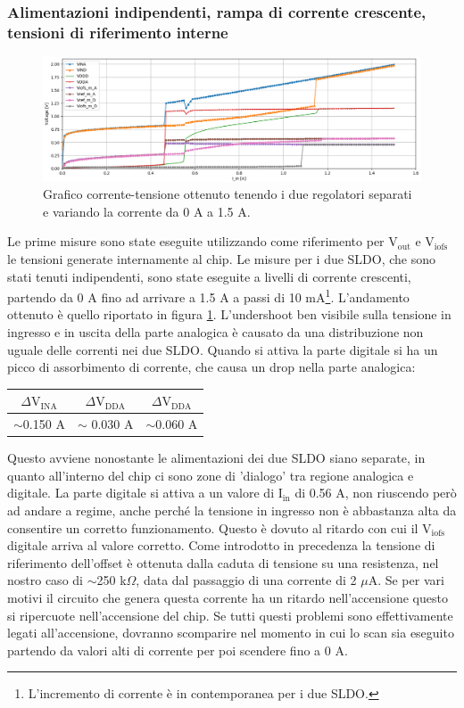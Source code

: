 \subsubsection{Alimentazioni indipendenti, rampa di corrente crescente, tensioni di riferimento interne}
\begin{figure}
\centering
\includegraphics[width=\textwidth]{Immagini/IUI2}
\caption{Grafico corrente-tensione ottenuto tenendo i due regolatori separati e variando la corrente da 0 A a 1.5 A.}
\label{IUI}
\end{figure}
Le prime misure sono state eseguite utilizzando come riferimento per $\mathrm{V_{out}}$ e $\mathrm{V_{iofs}}$ le tensioni generate internamente al chip. Le misure per i due SLDO, che sono stati tenuti indipendenti, sono state eseguite a livelli di corrente crescenti, partendo da 0 A fino ad arrivare a 1.5 A a passi di 10 mA\footnote{L'incremento di corrente è in contemporanea per i due SLDO.}. 
L'andamento ottenuto è quello riportato in figura \ref{IUI}. L'undershoot ben visibile sulla tensione in ingresso e in uscita della parte analogica è causato da una distribuzione non uguale delle correnti nei due SLDO. 
Quando si attiva la parte digitale si ha un picco di assorbimento di corrente, che causa un drop nella parte analogica:
\begin{center}
\begin{tabular}{ccc }
\hline
$\Delta \mathrm{V_{INA}}$ & $\Delta \mathrm{V_{DDA}}$ &$\Delta \mathrm{V_{DDA}}$  \\ \hline
$\sim$0.150 A & $\sim$ 0.030 A& $\sim$0.060 A\\ \hline     
\end{tabular}
\end{center}

Questo avviene nonostante le alimentazioni dei due SLDO siano separate, in quanto all'interno del chip ci sono zone di 'dialogo' tra regione analogica e digitale. 
La parte digitale si attiva a un valore di $\mathrm{I_{in}}$ di 0.56 A, non riuscendo però ad andare a regime, anche perché la tensione in ingresso non è abbastanza alta da consentire un corretto funzionamento.
Questo è dovuto al ritardo con cui il $\mathrm{V_{iofs}}$ digitale arriva al valore corretto. Come introdotto in precedenza la tensione di riferimento dell'offset è ottenuta dalla caduta di tensione su una resistenza, nel nostro caso di $\sim$250 k$\Omega$, data dal passaggio di una corrente di 2 $\mu$A. Se per vari motivi il circuito che genera questa corrente ha un ritardo nell'accensione questo si ripercuote nell'accensione del chip.  
Se tutti questi problemi sono effettivamente legati all'accensione, dovranno scomparire nel momento in cui lo scan sia eseguito partendo da valori alti di corrente per poi scendere fino a 0 A.


